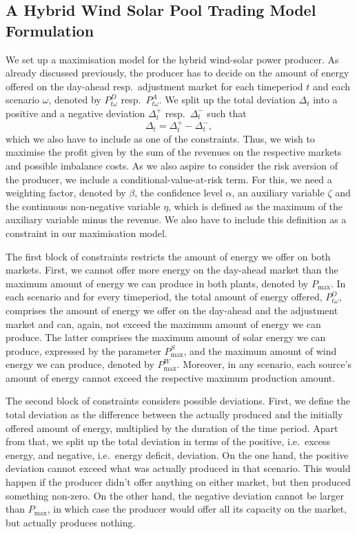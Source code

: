 \subsection{ A Hybrid Wind Solar Pool Trading Model Formulation}
We set up a maximisation model for the hybrid wind-solar power producer. As already discussed previously, the producer has to decide on the amount of energy offered on the day-ahead resp.\ adjustment market for each timeperiod $t$ and each scenario $\omega$, denoted by $P^{D}_{t \omega}$ resp.\ $P^{A}_{t \omega}$. We split up the total deviation $\Delta_{t}$ into a positive and a negative deviation $\Delta_{t}^{+}$ resp.\ $\Delta_{t}^{-}$ such that
\begin{equation*}
	\Delta_{t}=\Delta_{t}^{+}-\Delta_{t}^{-},
\end{equation*}
which we also have to include as one of the constraints. Thus, we wish to maximise the profit given by the sum of the revenues on the respective markets and possible imbalance costs. As we also aspire to consider the risk aversion of the producer, we include a conditional-value-at-risk term. For this, we need a weighting factor, denoted by $\beta$, the confidence level $\alpha$, an auxiliary variable $\zeta$ and the continuous non-negative variable $\eta$, which is defined as the maximum of the auxiliary variable minus the revenue. We also have to include this definition as a constraint in our maximisation model. 

The first block of constraints restricts the amount of energy we offer on both markets. First, we cannot offer more energy on the day-ahead market than the maximum amount of energy we can produce in both plants, denoted by $P_{\max}$. In each scenario and for every timeperiod, the total amount of energy offered, $P^{O}_{t \omega}$, comprises the amount of energy we offer on the day-ahead and the adjustment market and can, again, not exceed the maximum amount of energy we can produce. The latter comprises the maximum amount of solar energy we can produce, expressed by the parameter $P_{\max}^{S}$, and the maximum amount of wind energy we can produce, denoted by $P_{\max}^{W}$. Moreover, in any scenario, each source's amount of energy cannot exceed the respective maximum production amount. 

The second block of constraints considers possible deviations. First, we define the total deviation as the difference between the actually produced and the initially offered amount of energy, multiplied by the duration of the time period. Apart from that, we split up the total deviation in terms of the positive, i.e.\ excess energy, and negative, i.e.\ energy deficit, deviation. On the one hand, the positive deviation cannot exceed what was actually produced in that scenario. This would happen if the producer didn't offer anything on either market, but then produced something non-zero. On the other hand, the negative deviation cannot be larger than $P_{\max}$, in which case the producer would offer all its capacity on the market, but actually produces nothing. 

